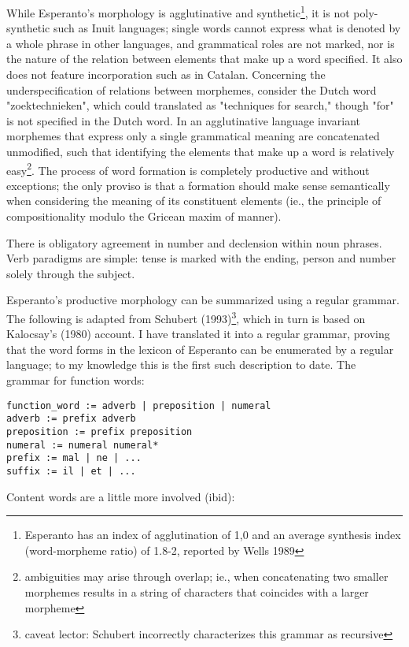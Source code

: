 \documentclass[10pt,a4paper]{article}
\begin{document}
While Esperanto's morphology is agglutinative and synthetic\footnote{Esperanto
has an index of agglutination of 1,0 and an average synthesis index
(word-morpheme ratio) of 1.8-2, reported by Wells 1989}, it is not
poly-synthetic such as Inuit languages; single words cannot express what is
denoted by a whole phrase in other languages, and grammatical roles are not
marked, nor is the nature of the relation between elements that make up a word
specified. It also does not feature incorporation such as in Catalan.
Concerning the underspecification of relations between morphemes, consider the
Dutch word "zoektechnieken", which could translated as "techniques for search,"
though "for" is not specified in the Dutch word. In an agglutinative language
invariant morphemes that express only a single grammatical meaning are
concatenated unmodified, such that identifying the elements that make up a word
is relatively easy\footnote{ambiguities may arise through overlap; ie., when
concatenating two smaller morphemes results in a string of characters that
coincides with a larger morpheme}. The process of word formation is completely
productive and without exceptions; the only proviso is that a formation should
make sense semantically when considering the meaning of its constituent
elements (ie., the principle of compositionality modulo the Gricean maxim of
manner). 

There is obligatory agreement in number and declension within noun phrases.
Verb paradigms are simple: tense is marked with the ending, person and number
solely through the subject.

Esperanto's productive morphology can be summarized using a regular
grammar. The following is adapted from Schubert (1993)\footnote{caveat lector:
Schubert incorrectly characterizes this grammar as recursive}, which in turn is
based on Kalocsay's (1980) account. I have translated it into a regular
grammar, proving that the word forms in the lexicon of Esperanto can be
enumerated by a regular language; to my knowledge this is the first such
description to date.  The grammar for function words: 

\begin{verbatim}
function_word := adverb | preposition | numeral
adverb := prefix adverb
preposition := prefix preposition
numeral := numeral numeral*
prefix := mal | ne | ...
suffix := il | et | ...
\end{verbatim}

Content words are a little more involved (ibid):
\end{document}
